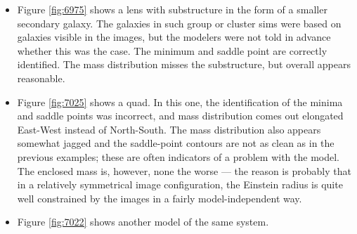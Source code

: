 \begin{itemize}
\item Figure \ref{fig:6975} shows a lens with substructure in the form
  of a smaller secondary galaxy.  The galaxies in such group or
  cluster sims were based on galaxies visible in the images, but the
  modelers were not told in advance whether this was the case.  The
  minimum and saddle point are correctly identified.  The mass
  distribution misses the substructure, but overall appears
  reasonable.

\item Figure \ref{fig:7025} shows a quad.  In this one, the
  identification of the minima and saddle points was incorrect, and
  mass distribution comes out elongated East-West instead of
  North-South.  The mass distribution also appears somewhat jagged and
  the saddle-point contours are not as clean as in the previous
  examples; these are often indicators of a problem with the model.
  The enclosed mass is, however, none the worse --- the reason is
  probably that in a relatively symmetrical image configuration, the
  Einstein radius is quite well constrained by the images in a fairly
  model-independent way.

\item Figure \ref{fig:7022} shows another model of the same system.

\end{itemize}

